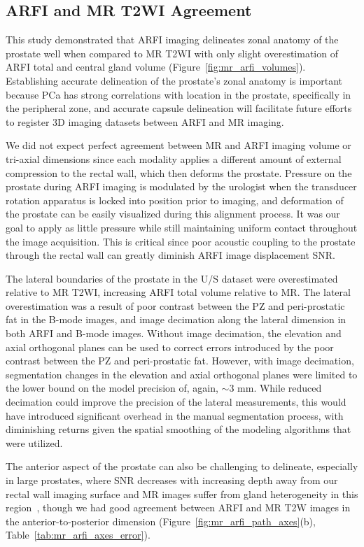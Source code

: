 \subsection{ARFI and MR T2WI Agreement}
This study demonstrated that ARFI imaging delineates zonal anatomy of the
prostate well when compared to MR T2WI with only slight overestimation of ARFI
total and central gland volume (Figure~\ref{fig:mr_arfi_volumes}).
Establishing accurate delineation of the prostate's zonal anatomy is important
because PCa has strong correlations with location in the prostate, specifically
in the peripheral zone, and accurate capsule delineation will facilitate
future efforts to register 3D imaging datasets between ARFI and MR imaging. 

We did not expect perfect agreement between MR and ARFI imaging volume or
tri-axial dimensions since each modality applies a different amount of external
compression to the rectal wall, which then deforms the prostate.  Pressure on
the prostate during ARFI imaging is modulated by the urologist when the
transducer rotation apparatus is locked into position prior to imaging, and
deformation of the prostate can be easily visualized during this alignment
process.  It was our goal to apply as little pressure while still maintaining
uniform contact throughout the image acquisition. This is critical since poor
acoustic coupling to the prostate through the rectal wall can greatly diminish
ARFI image displacement SNR.

The lateral boundaries of the prostate in the U/S dataset were overestimated
relative to MR T2WI, increasing ARFI total volume relative to MR. The lateral
overestimation was a result of poor contrast between the PZ and peri-prostatic
fat in the B-mode images, and image decimation along the lateral dimension in
both ARFI and B-mode images. Without image decimation, the elevation and axial
orthogonal planes can be used to correct errors introduced by the poor contrast
between the PZ and peri-prostatic fat. However, with image decimation,
segmentation changes in the elevation and axial orthogonal planes were limited
to the lower bound on the model precision of, again, $\sim$3 mm.  While reduced
decimation could improve the precision of the lateral measurements, this would
have introduced significant overhead in the manual segmentation process, with
diminishing returns given the spatial smoothing of the modeling algorithms that
were utilized. 

The anterior aspect of the prostate can also be challenging to delineate,
especially in large prostates, where SNR decreases with increasing depth away
from our rectal wall imaging surface and MR images suffer from gland
heterogeneity in this region~\cite{Gupta2013}, though we had good agreement
between ARFI and MR T2W images in the anterior-to-posterior dimension
(Figure~\ref{fig:mr_arfi_path_axes}(b), Table~\ref{tab:mr_arfi_axes_error}).

